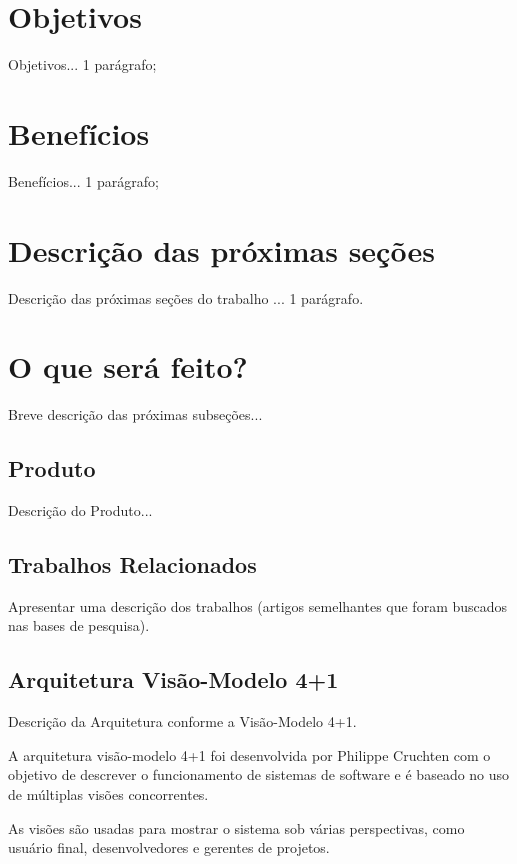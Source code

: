 \documentclass[12pt]{article}
\begin{document}
\section{Objetivos} 
Objetivos... 1 parágrafo;

\section{Benefícios} 

Benefícios... 1 parágrafo;

\section{Descrição das próximas seções} 
Descrição das próximas seções do trabalho ... 1 parágrafo.


\section{O que será feito? } \label{sec:oque}

Breve descrição das próximas subseções...\\

\subsection{Produto}

Descrição do Produto...

\subsection{Trabalhos Relacionados}

Apresentar uma descrição dos trabalhos (artigos semelhantes que foram buscados nas bases de pesquisa).

\subsection{Arquitetura Visão-Modelo 4+1}

Descrição da Arquitetura conforme a Visão-Modelo 4+1.

A arquitetura visão-modelo 4+1 foi desenvolvida por Philippe Cruchten com o objetivo de descrever o funcionamento de sistemas de software e é baseado no uso de múltiplas visões concorrentes.

As visões são usadas para mostrar o sistema sob várias perspectivas, como usuário final, desenvolvedores e gerentes de projetos.
\end{document}
